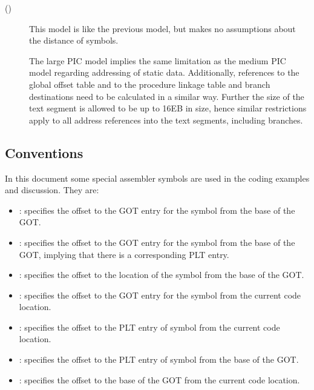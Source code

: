 \begin{description}
\item[
  ()]

  This model is like the previous model, but makes no assumptions
  about the distance of symbols.

  The large PIC model implies the same limitation as the medium
  PIC model regarding addressing of static data.  Additionally,
  references to the global offset table and to the procedure linkage
  table and branch destinations need to be calculated in a similar
  way.  Further the size of the text segment is allowed to be up to
  16EB in size, hence similar restrictions apply to all address
  references into the text segments, including branches.

\end{description}

\subsection{Conventions}

In this document some special assembler symbols are used in the coding
examples and discussion.  They are:

\begin{itemize}
\item {}: specifies the offset to the GOT entry for
      the symbol  from the base of the GOT.
\item {}: specifies the offset to the GOT entry for
      the symbol  from the base of the GOT, implying that
      there is a corresponding PLT entry.
\item {}: specifies the offset to the location of
      the symbol  from the base of the GOT.
\item {}: specifies the offset to the GOT entry
      for the symbol  from the current code location.
\item {}: specifies the offset to the PLT entry of
      symbol  from the current code location.
\item {}: specifies the offset to the PLT entry of
      symbol  from the base of the GOT.
\item {}: specifies the offset to the base
      of the GOT from the current code location.
\end{itemize}

